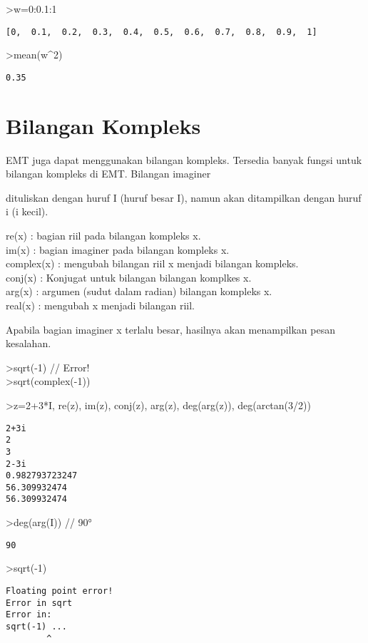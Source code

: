 \documentclass[
]{book}
\begin{document}
\textgreater w=0:0.1:1

\begin{verbatim}
[0,  0.1,  0.2,  0.3,  0.4,  0.5,  0.6,  0.7,  0.8,  0.9,  1]
\end{verbatim}

\textgreater mean(w\^{}2)

\begin{verbatim}
0.35
\end{verbatim}

\chapter{Bilangan Kompleks}\label{bilangan-kompleks}

EMT juga dapat menggunakan bilangan kompleks. Tersedia banyak fungsi untuk bilangan kompleks di EMT. Bilangan imaginer

dituliskan dengan huruf I (huruf besar I), namun akan ditampilkan dengan huruf i (i kecil).

re(x) : bagian riil pada bilangan kompleks x.\\
im(x) : bagian imaginer pada bilangan kompleks x.\\
complex(x) : mengubah bilangan riil x menjadi bilangan kompleks.\\
conj(x) : Konjugat untuk bilangan bilangan komplkes x.\\
arg(x) : argumen (sudut dalam radian) bilangan kompleks x.\\
real(x) : mengubah x menjadi bilangan riil.

Apabila bagian imaginer x terlalu besar, hasilnya akan menampilkan pesan kesalahan.

\textgreater sqrt(-1) // Error!\\
\textgreater sqrt(complex(-1))

\textgreater z=2+3*I, re(z), im(z), conj(z), arg(z), deg(arg(z)), deg(arctan(3/2))

\begin{verbatim}
2+3i
2
3
2-3i
0.982793723247
56.309932474
56.309932474
\end{verbatim}

\textgreater deg(arg(I)) // 90°

\begin{verbatim}
90
\end{verbatim}

\textgreater sqrt(-1)

\begin{verbatim}
Floating point error!
Error in sqrt
Error in:
sqrt(-1) ...
        ^
\end{verbatim}
\end{document}
